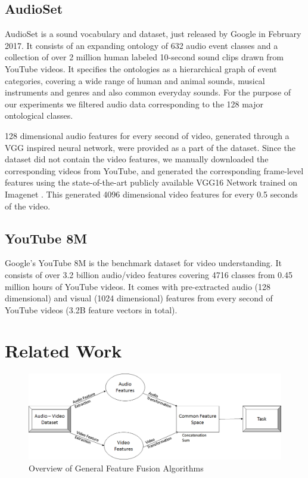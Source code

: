 \documentclass{article}
\begin{document}
\subsection{AudioSet}
AudioSet \cite{audioset} is a sound vocabulary and dataset, just released by Google in February 2017. It consists of an expanding ontology of 632 audio event classes and a collection of over 2 million human labeled 10-second sound clips drawn from YouTube videos. It specifies the ontologies as a hierarchical graph of event categories, covering a wide range of human and animal sounds, musical instruments and genres and also common everyday sounds. For the purpose of our experiments we filtered audio data corresponding to the 128 major ontological classes. 

128 dimensional audio features for every second of video, generated through a VGG inspired neural network, were provided as a part of the dataset. Since the dataset did not contain the video features, we manually downloaded the corresponding videos from YouTube, and generated the corresponding frame-level features using the state-of-the-art publicly available VGG16 Network \cite{vgg16} trained on Imagenet \cite{imagenet}. This generated 4096 dimensional video features for every 0.5 seconds of the video. 

\subsection{YouTube 8M}
Google's YouTube 8M  \cite{youtube8m}  is the benchmark dataset for video understanding. It consists of over 3.2 billion audio/video features covering 4716 classes from 0.45 million hours of YouTube videos. It comes with pre-extracted audio (128 dimensional) and visual (1024 dimensional) features from every second of YouTube videos (3.2B feature vectors in total). 


\section{Related Work}
\begin{center} 
\begin{figure}[h]
\label{fig:overview1}
\includegraphics[width=1\textwidth]{figures/overview.png}
\caption{Overview of General Feature Fusion Algorithms}
\end{figure}
\end{center}
\end{document}
